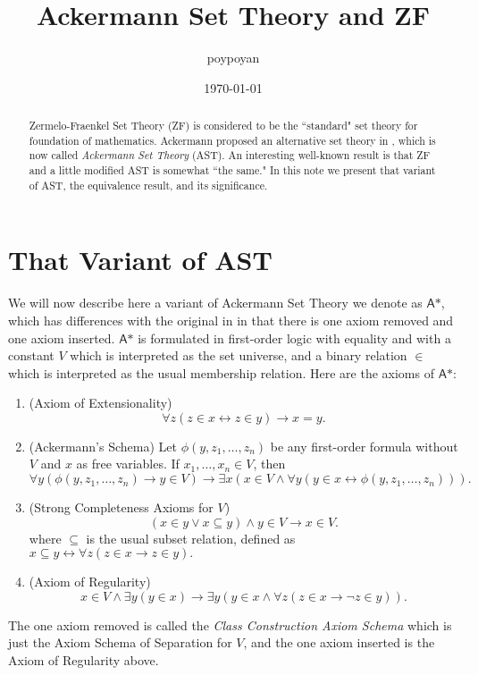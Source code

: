 \documentclass{article}
\title{Ackermann Set Theory and ZF}
\author{poypoyan}
\date{\petsa\today}
\begin{document}
\maketitle

\begin{abstract}
Zermelo-Fraenkel Set Theory (ZF) is considered to be the ``standard" set theory for foundation of mathematics. Ackermann proposed an alternative set theory in \cite{ackermann}, which is now called \textit{Ackermann Set Theory} (AST). An interesting well-known result is that ZF and a little modified AST is somewhat ``the same." In this note we present that variant of AST, the equivalence result, and its significance.
\end{abstract}

\section{That Variant of AST}
We will now describe here a variant of Ackermann Set Theory we denote as $\textsf{A*}$, which has differences with the original in \cite{ackermann} in that there is one axiom removed and one axiom inserted. $\textsf{A*}$ is formulated in first-order logic with equality and with a constant $V$ which is interpreted as the set universe, and a binary relation $\in$ which is interpreted as the usual membership relation. Here are the axioms of $\textsf{A*}$:
\begin{enumerate}
	\item (Axiom of Extensionality) $$\forall z(z\in x \leftrightarrow z \in y) \rightarrow x = y.$$
	\item (Ackermann's Schema) Let $\phi(y, z_1, \ldots, z_n)$ be any first-order formula without $V$ and $x$ as free variables. If $x_1, \ldots, x_n \in V$, then $$\forall y(\phi(y, z_1, \ldots, z_n) \rightarrow y \in V) \rightarrow \exists x(x \in V \wedge \forall y(y \in x \leftrightarrow \phi(y, z_1, \ldots, z_n))).$$
	\item (Strong Completeness Axioms for $V$) $$(x \in y \vee x \subseteq y) \wedge y \in V \rightarrow x \in V.$$ where $\subseteq$ is the usual subset relation, defined as $x \subseteq y \leftrightarrow \forall z(z \in x \rightarrow z \in y).$
	\item (Axiom of Regularity) $$x \in V \wedge \exists y(y \in x) \rightarrow \exists y(y \in x \wedge \forall z(z \in x \rightarrow \neg z \in y)).$$
\end{enumerate}
The one axiom removed is called the \textit{Class Construction Axiom Schema} which is just the Axiom Schema of Separation for $V$, and the one axiom inserted is the Axiom of Regularity above.
\end{document}
